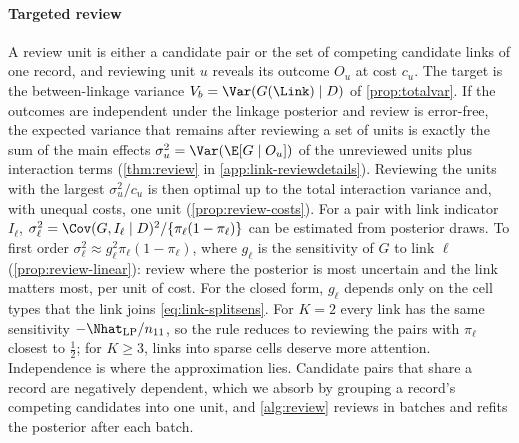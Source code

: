 \paragraph{Targeted review}
A review unit is either a candidate pair or the set of competing candidate links of one record, and reviewing unit $u$ reveals its outcome $O_u$ at cost $c_u$. The target is the between-linkage variance $V_b=\Var(G(\Link)\mid D)$ of \cref{prop:totalvar}. If the outcomes are independent under the linkage posterior and review is error-free, the expected variance that remains after reviewing a set of units is exactly the sum of the main effects $\sigma_u^2=\Var(\E[G\mid O_u])$ of the unreviewed units plus interaction terms (\cref{thm:review} in \cref{app:link-reviewdetails}). Reviewing the units with the largest $\sigma_u^2/c_u$ is then optimal up to the total interaction variance and, with unequal costs, one unit (\cref{prop:review-costs}). For a pair with link indicator $I_\ell$, $\sigma_\ell^2=\Cov(G,I_\ell\mid D)^2/\{\pi_\ell(1-\pi_\ell)\}$ can be estimated from posterior draws. To first order $\sigma_\ell^2\approx g_\ell^2\pi_\ell(1-\pi_\ell)$, where $g_\ell$ is the sensitivity of $G$ to link $\ell$ (\cref{prop:review-linear}): review where the posterior is most uncertain and the link matters most, per unit of cost. For the closed form, $g_\ell$ depends only on the cell types that the link joins \eqref{eq:link-splitsens}. For $K=2$ every link has the same sensitivity $-\Nhat_{\mathrm{LP}}/n_{11}$, so the rule reduces to reviewing the pairs with $\pi_\ell$ closest to $\frac12$; for $K\ge3$, links into sparse cells deserve more attention. Independence is where the approximation lies. Candidate pairs that share a record are negatively dependent, which we absorb by grouping a record's competing candidates into one unit, and \cref{alg:review} reviews in batches and refits the posterior after each batch.

